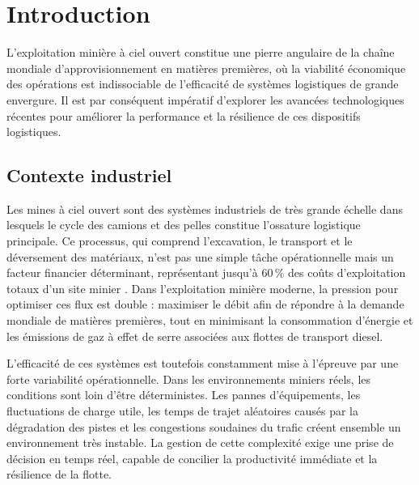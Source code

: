 \documentclass[11pt,a4paper]{article}
\begin{document}
\section{Introduction}
\label{sec:intro}

L'exploitation minière à ciel ouvert constitue une pierre angulaire de la chaîne mondiale d'approvisionnement en matières premières, où la viabilité économique des opérations est indissociable de l'efficacité de systèmes logistiques de grande envergure. Il est par conséquent impératif d'explorer les avancées technologiques récentes pour améliorer la performance et la résilience de ces dispositifs logistiques.

\subsection{Contexte industriel}

Les mines à ciel ouvert sont des systèmes industriels de très grande échelle dans lesquels le cycle des camions et des pelles constitue l'ossature logistique principale. Ce processus, qui comprend l'excavation, le transport et le déversement des matériaux, n'est pas une simple tâche opérationnelle mais un facteur financier déterminant, représentant jusqu'à 60\,\% des coûts d'exploitation totaux d'un site minier \cite{Afrapoli2017}. Dans l'exploitation minière moderne, la pression pour optimiser ces flux est double : maximiser le débit afin de répondre à la demande mondiale de matières premières, tout en minimisant la consommation d'énergie et les émissions de gaz à effet de serre associées aux flottes de transport diesel.

L'efficacité de ces systèmes est toutefois constamment mise à l'épreuve par une forte variabilité opérationnelle. Dans les environnements miniers réels, les conditions sont loin d'être déterministes. Les pannes d'équipements, les fluctuations de charge utile, les temps de trajet aléatoires causés par la dégradation des pistes et les congestions soudaines du trafic créent ensemble un environnement très instable. La gestion de cette complexité exige une prise de décision en temps réel, capable de concilier la productivité immédiate et la résilience de la flotte.
\end{document}
